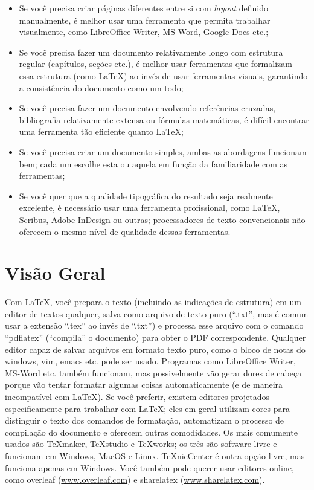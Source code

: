\begin{itemize}
\item Se você precisa criar páginas diferentes entre si com \emph{layout}
definido manualmente, é melhor usar uma ferramenta que permita trabalhar
visualmente, como LibreOffice Writer, MS-Word, Google Docs etc.;

\item Se você precisa fazer um documento relativamente longo com estrutura
regular (capítulos, seções etc.), é melhor usar ferramentas que formalizam
essa estrutura (como \LaTeX{}) ao invés de usar ferramentas visuais,
garantindo a consistência do documento como um todo;

\item Se você precisa fazer um documento envolvendo referências cruzadas,
bibliografia relativamente extensa ou fórmulas matemáticas, é difícil
encontrar uma ferramenta tão eficiente quanto \LaTeX{};

\item Se você precisa criar um documento simples, ambas as abordagens
funcionam bem; cada um escolhe esta ou aquela em função da familiaridade
com as ferramentas;

\item Se você quer que a qualidade tipográfica do resultado seja realmente
excelente, é necessário usar uma ferramenta profissional, como \LaTeX{},
Scribus, Adobe InDesign ou outras; processadores de texto convencionais não
oferecem o mesmo nível de qualidade dessas ferramentas.
\end{itemize}

\section{Visão Geral}

Com \LaTeX{}, você prepara o texto (incluindo as indicações de estrutura) em
um editor de textos qualquer, salva como arquivo de texto puro (``.txt'',
mas é comum usar a extensão ``.tex'' ao invés de ``.txt'') e processa esse
arquivo com o comando ``pdflatex'' (``compila'' o documento) para obter o
PDF correspondente. Qualquer editor capaz de salvar arquivos em formato
texto puro, como o bloco de notas do windows, vim, emacs etc. pode ser usado.
Programas como LibreOffice Writer, MS-Word etc. também funcionam, mas
possivelmente vão gerar dores de cabeça porque vão tentar formatar algumas
coisas automaticamente (e de maneira incompatível com \LaTeX{}). Se você
preferir, existem editores projetados especificamente para trabalhar com
\LaTeX{}; eles em geral utilizam cores para distinguir o texto dos comandos
de formatação, automatizam o processo de compilação do documento e oferecem
outras comodidades. Os mais comumente usados são TeXmaker, TeXstudio e
TeXworks; os três são software livre e funcionam em Windows, MacOS e Linux.
TeXnicCenter é outra opção livre, mas funciona apenas em Windows. Você também
pode querer usar editores online, como overleaf (\url{www.overleaf.com}) e
sharelatex (\url{www.sharelatex.com}).

